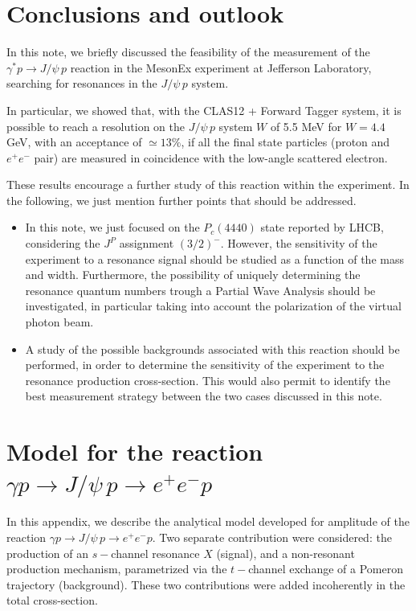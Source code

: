 \documentclass[a4paper,10pt]{article}
\begin{document}
\section{Conclusions and outlook}

In this note, we briefly discussed the feasibility of the measurement of the $\gamma^* p \rightarrow J/\psi \, p$ reaction in the MesonEx experiment at Jefferson Laboratory, searching for resonances in the $J/\psi\,p$ system. 

In particular, we showed that, with the CLAS12 + Forward Tagger system, it is possible to reach a resolution on the $J/\psi \, p$ system $W$ of 5.5 MeV for $W=4.4$ GeV, with an acceptance of $\simeq 13\%$, if all the final state particles (proton and $e^+ e^-$ pair) are measured in coincidence with the low-angle scattered electron. 
 
These results encourage a further study of this reaction within the experiment. In the following, we just mention further points that should be addressed.
\begin{itemize}
\item{In this note, we just focused on the $P_c(4440)$ state reported by LHCB, considering the $J^P$ assignment $(3/2)^-$. However, the sensitivity of the experiment to a resonance signal should be studied as a function of the mass and width. Furthermore, the possibility of uniquely determining the resonance quantum numbers trough a Partial Wave Analysis should be investigated, in particular taking into account the polarization of the virtual photon beam.}
\item{A study of the possible backgrounds associated with this reaction should be performed, in order to determine the sensitivity of the experiment to the resonance production cross-section. This would also permit to identify the best measurement strategy between the two cases discussed in this note.}
\end{itemize}  

\appendix
\section{Model for the reaction $\gamma p \rightarrow J/\psi \, p \rightarrow e^+ e^- p$ }\label{app:model}

In this appendix, we describe the analytical model developed for amplitude of the reaction $\gamma p \rightarrow J/\psi \, p \rightarrow e^+ e^-  p$. Two separate contribution were considered: the production of an $s-$channel resonance $X$ (signal), and a non-resonant production mechanism, parametrized via the $t-$channel exchange of a Pomeron trajectory (background). These two contributions were added incoherently in the total cross-section.
\end{document}
